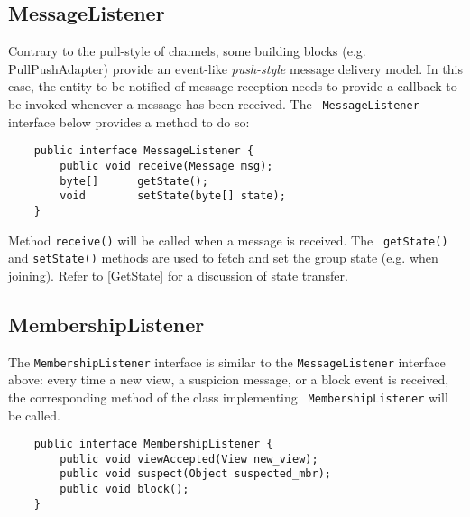     \subsection{MessageListener}

    Contrary to the pull-style of channels, some building blocks
    (e.g. PullPushAdapter) provide an event-like {\em push-style} message delivery
    model. In this case, the entity to be notified of message reception needs to
    provide a callback to be invoked whenever a message has been received. The {\tt
    MessageListener} interface below provides a
    method to do so:

    \begin{small}
    \begin{verbatim}
    public interface MessageListener {
        public void receive(Message msg);
        byte[]      getState();
        void        setState(byte[] state);
    }
    \end{verbatim}
    \end{small}

    Method {\tt receive()} will be called when a message is received. The {\tt
    getState()} and {\tt setState()} methods are used to fetch and set the group
    state (e.g. when joining). Refer to \ref{GetState} for a discussion of state
    transfer.


    \subsection{MembershipListener} \label{MembershipListener}

    The {\tt MembershipListener} interface is similar to the {\tt MessageListener}
    interface above: every time a new view, a suspicion message, or a block event is
    received, the corresponding method of the class implementing {\tt
    MembershipListener} will be called.
	
    \begin{small}
    \begin{verbatim}
    public interface MembershipListener {    
        public void viewAccepted(View new_view);
        public void suspect(Object suspected_mbr);
        public void block();
    }
    \end{verbatim}
    \end{small}

